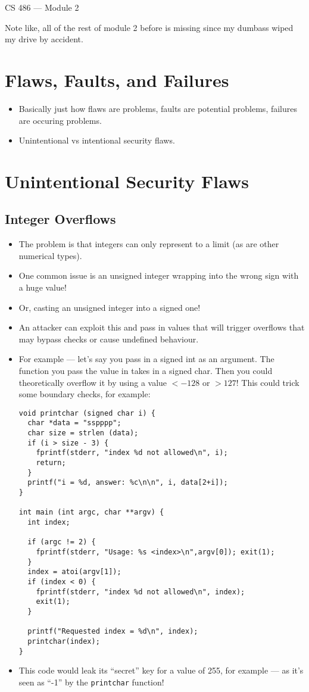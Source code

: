 \documentclass{article}
\author{Clement Tsang}
\begin{document}
\begin{center}
    \Large{CS 486 --- Module 2}
\end{center}

Note like, all of the rest of module 2 before is missing since my dumbass wiped my drive by accident.

\section{Flaws, Faults, and Failures}
\begin{itemize}
    \item Basically just how flaws are problems, faults are potential problems, failures are occuring problems.
    \item Unintentional vs intentional security flaws.
\end{itemize}

\section{Unintentional Security Flaws}

\subsection{Integer Overflows}
\begin{itemize}
    \item The problem is that integers can only represent to a limit (as are other numerical types).
    \item One common issue is an unsigned integer wrapping into the wrong sign with a huge value!
    \item Or, casting an unsigned integer into a signed one!
    \item An attacker can exploit this and pass in values that will trigger overflows that may bypass checks or cause undefined behaviour.
    \item For example --- let's say you pass in a signed int as an argument.  The function you pass the value in takes in a signed char.  Then you could theoretically overflow it by using a value $< -128$ or $> 127$!  This could trick some boundary checks, for example:
\begin{lstlisting}
void printchar (signed char i) {
  char *data = "sspppp";
  char size = strlen (data);
  if (i > size - 3) {
	fprintf(stderr, "index %d not allowed\n", i);
	return;
  }
  printf("i = %d, answer: %c\n\n", i, data[2+i]);
}

int main (int argc, char **argv) {
  int index;

  if (argc != 2) {
    fprintf(stderr, "Usage: %s <index>\n",argv[0]); exit(1);
  }
  index = atoi(argv[1]);
  if (index < 0) {
	fprintf(stderr, "index %d not allowed\n", index);
	exit(1);
  }

  printf("Requested index = %d\n", index);
  printchar(index);
}
\end{lstlisting}
    \item This code would leak its ``secret'' key for a value of 255, for example --- as it's seen as ``-1'' by the \lstinline{printchar} function!
\end{itemize}
\end{document}
